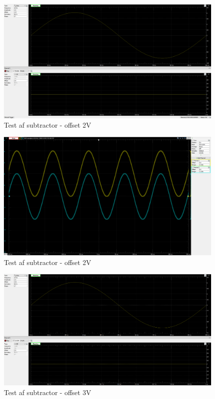 \begin{figure}[h!]
	\centering
	\includegraphics[width=1\linewidth]{Hardwaredesign/Subtractor1}
	\caption{Test af subtractor - offset 2V}
	\label{fig:Subtractor1}
\end{figure}

\begin{figure}[h!]
	\centering
	\includegraphics[width=1\linewidth]{Hardwaredesign/Subtractor2}
	\caption{Test af subtractor - offset 2V}
	\label{fig:Subtractor2}
\end{figure}

\clearpage
\begin{figure}[h!]
	\centering
	\includegraphics[width=1\linewidth]{Hardwaredesign/Subtractor3}
	\caption{Test af subtractor - offset 3V}
	\label{fig:Subtractor3}
\end{figure}

